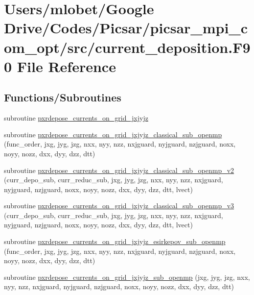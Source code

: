\hypertarget{current__deposition_8_f90}{}\section{Users/mlobet/\+Google Drive/\+Codes/\+Picsar/picsar\+\_\+mpi\+\_\+com\+\_\+opt/src/current\+\_\+deposition.F90 File Reference}
\label{current__deposition_8_f90}
\subsection*{Functions/\+Subroutines}
\begin{DoxyCompactItemize}
\item 
subroutine \hyperlink{current__deposition_8_f90_af9162fd522e5d0fe559fc65848991ee3}{pxrdepose\+\_\+currents\+\_\+on\+\_\+grid\+\_\+jxjyjz}
\item 
subroutine \hyperlink{current__deposition_8_f90_a3a0c5fb2e4682380dda0f71bcbf132d4}{pxrdepose\+\_\+currents\+\_\+on\+\_\+grid\+\_\+jxjyjz\+\_\+classical\+\_\+sub\+\_\+openmp} (func\+\_\+order, jxg, jyg, jzg, nxx, nyy, nzz, nxjguard, nyjguard, nzjguard, noxx, noyy, nozz, dxx, dyy, dzz, dtt)
\item 
subroutine \hyperlink{current__deposition_8_f90_a2624df4633b361373555666b08c92ca1}{pxrdepose\+\_\+currents\+\_\+on\+\_\+grid\+\_\+jxjyjz\+\_\+classical\+\_\+sub\+\_\+openmp\+\_\+v2} (curr\+\_\+depo\+\_\+sub, curr\+\_\+reduc\+\_\+sub, jxg, jyg, jzg, nxx, nyy, nzz, nxjguard, nyjguard, nzjguard, noxx, noyy, nozz, dxx, dyy, dzz, dtt, lvect)
\item 
subroutine \hyperlink{current__deposition_8_f90_a05b540593f69d201b9ac6e74b0fea593}{pxrdepose\+\_\+currents\+\_\+on\+\_\+grid\+\_\+jxjyjz\+\_\+classical\+\_\+sub\+\_\+openmp\+\_\+v3} (curr\+\_\+depo\+\_\+sub, curr\+\_\+reduc\+\_\+sub, jxg, jyg, jzg, nxx, nyy, nzz, nxjguard, nyjguard, nzjguard, noxx, noyy, nozz, dxx, dyy, dzz, dtt, lvect)
\item 
subroutine \hyperlink{current__deposition_8_f90_ae617423f1f21cbacb686a291c6b0ad7b}{pxrdepose\+\_\+currents\+\_\+on\+\_\+grid\+\_\+jxjyjz\+\_\+esirkepov\+\_\+sub\+\_\+openmp} (func\+\_\+order, jxg, jyg, jzg, nxx, nyy, nzz, nxjguard, nyjguard, nzjguard, noxx, noyy, nozz, dxx, dyy, dzz, dtt)
\item 
subroutine \hyperlink{current__deposition_8_f90_a7c88c5f1acf180c78f31dfdeb4b80516}{pxrdepose\+\_\+currents\+\_\+on\+\_\+grid\+\_\+jxjyjz\+\_\+sub\+\_\+openmp} (jxg, jyg, jzg, nxx, nyy, nzz, nxjguard, nyjguard, nzjguard, noxx, noyy, nozz, dxx, dyy, dzz, dtt)

\end{DoxyCompactItemize}
